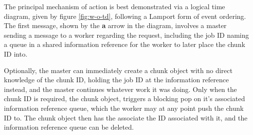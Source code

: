 \documentclass[a4paper,10pt]{article}
\begin{document}
The principal mechanism of action is best demonstrated via a logical time
diagram, given by figure \ref{fig:w-o-td}, following a Lamport form of
event ordering\cite{lamport1978ordering}.
The first message, shown by the \textbf{a} arrow in the diagram, involves a
master sending a message to a worker regarding the request, including the job
ID naming a queue in a shared information reference for the worker to later
place the chunk ID into.

Optionally, the master can immediately create a chunk object with no direct
knowledge of the chunk ID, holding the job ID at the information reference
instead, and the master continues whatever work it was doing.
Only when the chunk ID is required, the chunk object, triggers a blocking pop
on it's associated information reference queue, which the worker may
at any point push the chunk ID to.
The chunk object then has the associate the ID associated with it, and the
information reference queue can be deleted.
\end{document}
